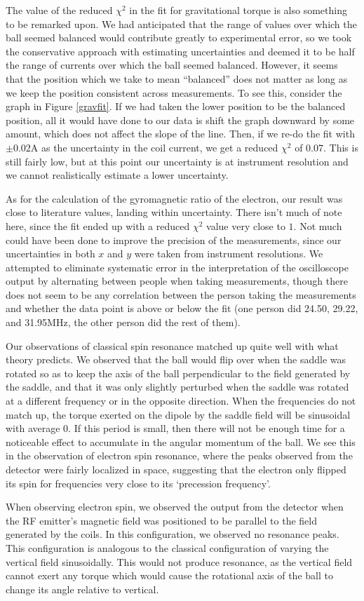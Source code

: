 \documentclass{amsart}
\numberwithin{equation}{section}
\begin{document}
The value of the reduced $\chi^2$ in the fit for gravitational torque is also something to be remarked upon. We had anticipated that the range of values over which the ball seemed balanced would contribute greatly to experimental error, so we took the conservative approach with estimating uncertainties and deemed it to be half the range of currents over which the ball seemed balanced. However, it seems that the position which we take to mean ``balanced'' does not matter as long as we keep the position consistent across measurements. To see this, consider the graph in Figure \ref{gravfit}. If we had taken the lower position to be the balanced position, all it would have done to our data is shift the graph downward by some amount, which does not affect the slope of the line. Then, if we re-do the fit with $\pm0.02$A as the uncertainty in the coil current, we get a reduced $\chi^2$ of 0.07. This is still fairly low, but at this point our uncertainty is at instrument resolution and we cannot realistically estimate a lower uncertainty. 

As for the calculation of the gyromagnetic ratio of the electron, our result was close to literature values, landing within uncertainty. There isn't much of note here, since the fit ended up with a reduced $\chi^2$ value very close to $1$. Not much could have been done to improve the precision of the measurements, since our uncertainties in both $x$ and $y$ were taken from instrument resolutions. We attempted to eliminate systematic error in the interpretation of the oscilloscope output by alternating between people when taking measurements, though there does not seem to be any correlation between the person taking the measurements and whether the data point is above or below the fit (one person did 24.50, 29.22, and 31.95MHz, the other person did the rest of them). 

Our observations of classical spin resonance matched up quite well with what theory predicts. We observed that the ball would flip over when the saddle was rotated so as to keep the axis of the ball perpendicular to the field generated by the saddle, and that it was only slightly perturbed when the saddle was rotated at a different frequency or in the opposite direction. When the frequencies do not match up, the torque exerted on the dipole by the saddle field will be sinusoidal with average $0$. If this period is small, then there will not be enough time for a noticeable effect to accumulate in the angular momentum of the ball. We see this in the observation of electron spin resonance, where the peaks observed from the detector were fairly localized in space, suggesting that the electron only flipped its spin for frequencies very close to its `precession frequency'. 

When observing electron spin, we observed the output from the detector when the RF emitter's magnetic field was positioned to be parallel to the field generated by the coils. In this configuration, we observed no resonance peaks. This configuration is analogous to the classical configuration of varying the vertical field sinusoidally. This would not produce resonance, as the vertical field cannot exert any torque which would cause the rotational axis of the ball to change its angle relative to vertical.
\end{document}
